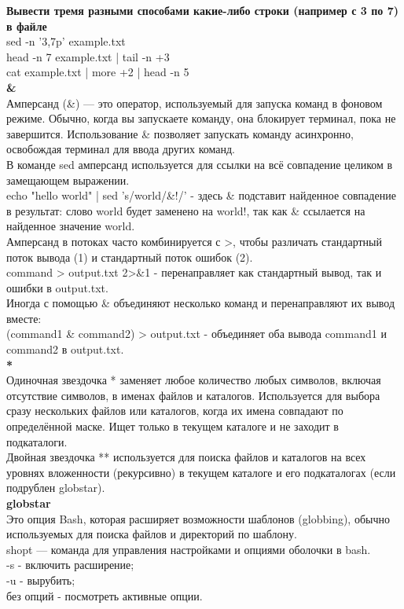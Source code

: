 \noindent \textbf{Вывести тремя разными способами какие-либо строки (например с 3 по 7) в файле} \\
sed -n '3,7p' example.txt \\
head -n 7 example.txt | tail -n +3 \\
cat example.txt | more +2 | head -n 5 \\

\noindent \textbf{\&} \\
Амперсанд (\&) — это оператор, используемый для запуска команд в фоновом режиме. Обычно, когда вы запускаете команду, она блокирует терминал, пока не завершится. Использование \& позволяет запускать команду асинхронно, освобождая терминал для ввода других команд. \\
В команде sed амперсанд используется для ссылки на всё совпадение целиком в замещающем выражении. \\
echo "hello world" | sed 's/world/\&!/' - здесь \& подставит найденное совпадение в результат: слово world будет заменено на world!, так как \& ссылается на найденное значение world. \\
Амперсанд в потоках часто комбинируется с >, чтобы различать стандартный поток вывода (1) и стандартный поток ошибок (2). \\
command > output.txt 2>\&1 - перенаправляет как стандартный вывод, так и ошибки в output.txt. \\ Иногда с помощью \& объединяют несколько команд и перенаправляют их вывод вместе: \\
(command1 \& command2) > output.txt - объединяет оба вывода command1 и command2 в output.txt. \\

\noindent \textbf{*} \\
Одиночная звездочка * заменяет любое количество любых символов, включая отсутствие символов, в именах файлов и каталогов. Используется для выбора сразу нескольких файлов или каталогов, когда их имена совпадают по определённой маске. Ищет только в текущем каталоге и не заходит в подкаталоги.\\
Двойная звездочка ** используется для поиска файлов и каталогов на всех уровнях вложенности (рекурсивно) в текущем каталоге и его подкаталогах (если подрублен globstar). \\

\noindent \textbf{globstar} \\
Это опция Bash, которая расширяет возможности шаблонов (globbing), обычно используемых для поиска файлов и директорий по шаблону. \\
shopt — команда для управления настройками и опциями оболочки в bash. \\
-s - включить расширение; \\
-u - вырубить; \\
без опций - посмотреть активные опции. \\

